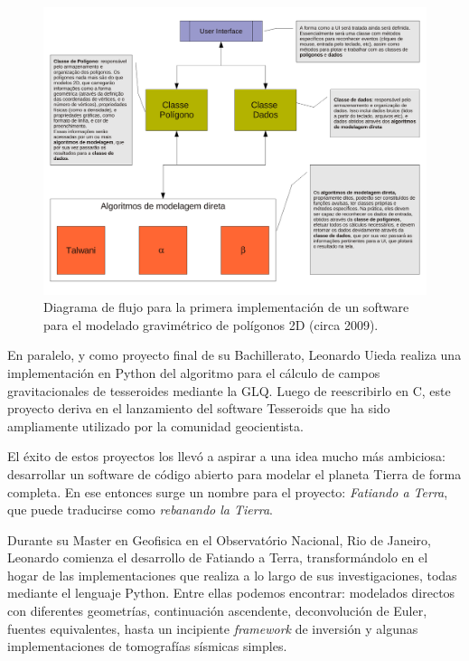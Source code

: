 \begin{figure}[h]
    \centering
    \includegraphics[width=\linewidth]{figs/fluxo-simples.pdf}
    \caption{
        Diagrama de flujo para la primera implementación de un software para el
        modelado gravimétrico de polígonos 2D
        (circa 2009).
    }
    \label{fig:talwani-idea}
\end{figure}

En paralelo, y como proyecto final de su Bachillerato, Leonardo Uieda realiza
una implementación en Python del algoritmo para el cálculo de campos
gravitacionales de tesseroides mediante la \ac{GLQ}.
Luego de reescribirlo en C, este proyecto deriva en el lanzamiento del software
Tesseroids \citep{uieda2016} que ha sido ampliamente utilizado por la comunidad
geocientista.

El éxito de estos proyectos los llevó a aspirar a una idea mucho más
ambiciosa: desarrollar un software de código abierto para modelar el planeta
Tierra de
forma completa.
En ese entonces surge un nombre para el proyecto: \emph{Fatiando a Terra}, que
puede traducirse como \emph{rebanando la Tierra}.

Durante su Master en Geofisica en el Observatório Nacional, Rio de Janeiro,
Leonardo comienza el desarrollo de Fatiando a Terra, transformándolo en el
hogar de las implementaciones que realiza a lo largo de sus investigaciones,
todas mediante el lenguaje Python.
Entre ellas podemos encontrar: modelados directos con diferentes geometrías,
continuación ascendente, deconvolución de Euler, fuentes equivalentes, hasta un
incipiente \emph{framework} de inversión y algunas implementaciones de
tomografías sísmicas simples.

